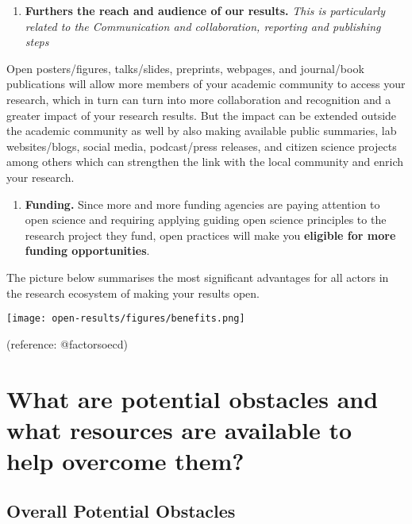 \documentclass[
  letterpaper,
  DIV=11,
  numbers=noendperiod]{scrreport}
\providecommand{\tightlist}{%
  \setlength{\itemsep}{0pt}\setlength{\parskip}{0pt}}\usepackage{longtable,booktabs,array}
\begin{document}
\begin{enumerate}
\def\labelenumi{\arabic{enumi}.}
\tightlist
\item
  \textbf{Furthers the reach and audience of our results.} \emph{This is
  particularly related to the Communication and collaboration, reporting
  and publishing steps}
\end{enumerate}

Open posters/figures, talks/slides, preprints, webpages, and
journal/book publications will allow more members of your academic
community to access your research, which in turn can turn into more
collaboration and recognition and a greater impact of your research
results. But the impact can be extended outside the academic community
as well by also making available public summaries, lab websites/blogs,
social media, podcast/press releases, and citizen science projects among
others which can strengthen the link with the local community and enrich
your research.

\begin{enumerate}
\def\labelenumi{\arabic{enumi}.}
\tightlist
\item
  \textbf{Funding.} Since more and more funding agencies are paying
  attention to open science and requiring applying guiding open science
  principles to the research project they fund, open practices will make
  you \textbf{eligible for more funding opportunities}.
\end{enumerate}

The picture below summarises the most significant advantages for all
actors in the research ecosystem of making your results open.

\texttt{[image: open-results/figures/benefits.png]}

(reference: @factorsoecd)

\hypertarget{what-are-potential-obstacles-and-what-resources-are-available-to-help-overcome-them}{%
\section{What are potential obstacles and what resources are available
to help overcome
them?}\label{what-are-potential-obstacles-and-what-resources-are-available-to-help-overcome-them}}

\hypertarget{overall-potential-obstacles}{%
\subsection{Overall Potential
Obstacles}\label{overall-potential-obstacles}}
\end{document}
